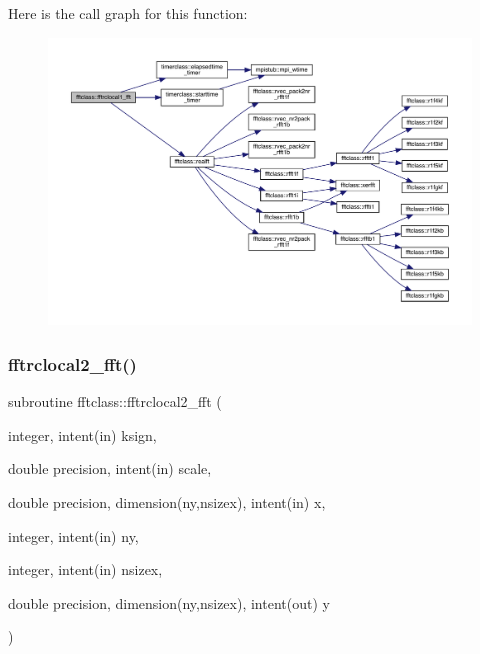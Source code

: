 Here is the call graph for this function\+:\nopagebreak
\begin{figure}[H]
\begin{center}
\leavevmode
\includegraphics[width=350pt]{namespacefftclass_af33a24fc1bf4d5763c335c0cef247e3c_cgraph}
\end{center}
\end{figure}
\mbox{\label{namespacefftclass_a83a1c8ccf853ae07fdfc5a80e1e244d1}} 
\subsubsection{\texorpdfstring{fftrclocal2\_fft()}{fftrclocal2\_fft()}}
{\footnotesize\ttfamily subroutine fftclass\+::fftrclocal2\+\_\+fft (\begin{DoxyParamCaption}\item[{integer, intent(in)}]{ksign,  }\item[{double precision, intent(in)}]{scale,  }\item[{double precision, dimension(ny,nsizex), intent(in)}]{x,  }\item[{integer, intent(in)}]{ny,  }\item[{integer, intent(in)}]{nsizex,  }\item[{double precision, dimension(ny,nsizex), intent(out)}]{y }\end{DoxyParamCaption})}

